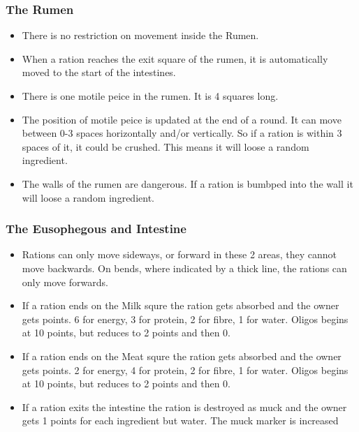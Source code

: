 	\subsubsection{The Rumen}
	  \begin{itemize}
	  	\item \pA There is no restriction on movement inside the Rumen.
	  	\item \pA When a ration reaches the exit square of the rumen, it is automatically moved to the start of the intestines.
	  	\item \pB There is one motile peice in the rumen. It is 4 squares long.
	  	\item \pB The position of motile peice is updated at the end of a round. It can move between 0-3 spaces horizontally and/or vertically. So if a ration is within 3 spaces of it, it could be crushed. This means it will loose a random ingredient.
	  	\item \pB The walls of the rumen are dangerous. If a ration is bumbped into the wall it will loose a random ingredient.
	  \end{itemize}
	\subsubsection{The Eusophegous and Intestine}
	  \begin{itemize}
	  	\item \pA Rations can only move sideways, or forward in these 2 areas, they cannot move backwards. On bends, where indicated by a thick line, the rations can only move forwards.
	  	\item \pA If a ration ends on the Milk squre the ration gets absorbed and the owner gets points. 6 for energy, 3 for protein, 2 for fibre, 1 for water. Oligos begins at 10 points, but reduces to 2 points and then 0.
	  	\item \pA If a ration ends on the Meat squre the ration gets absorbed and the owner gets points. 2 for energy, 4 for protein, 2 for fibre, 1 for water. Oligos begins at 10 points, but reduces to 2 points and then 0.
	  	\item \pA If a ration exits the intestine the ration is destroyed as muck and the owner gets 1 points for each ingredient but water. The muck marker is increased
	  \end{itemize}
